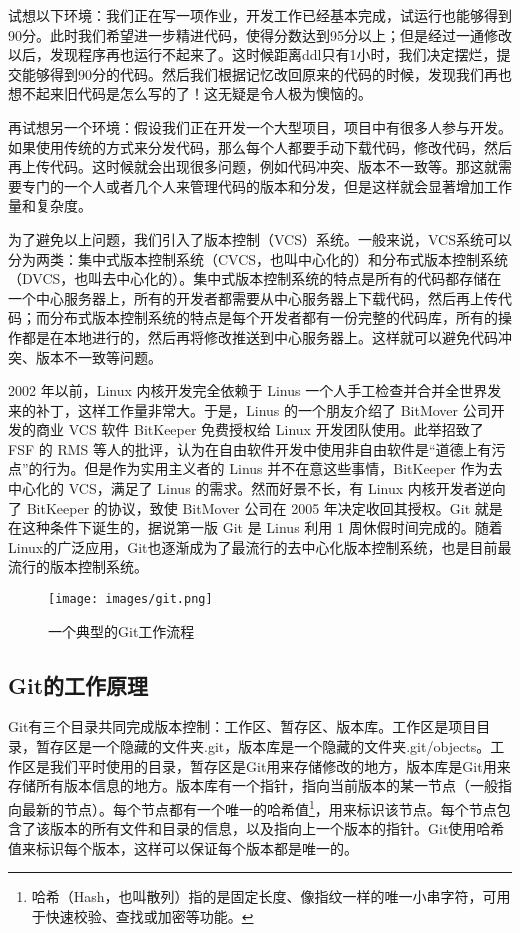 \documentclass[../main.tex]{subfiles}
\begin{document}
试想以下环境：我们正在写一项作业，开发工作已经基本完成，试运行也能够得到90分。此时我们希望进一步精进代码，使得分数达到95分以上；但是经过一通修改以后，发现程序再也运行不起来了。这时候距离ddl只有1小时，我们决定摆烂，提交能够得到90分的代码。然后我们根据记忆改回原来的代码的时候，发现我们再也想不起来旧代码是怎么写的了！这无疑是令人极为懊恼的。

再试想另一个环境：假设我们正在开发一个大型项目，项目中有很多人参与开发。如果使用传统的方式来分发代码，那么每个人都要手动下载代码，修改代码，然后再上传代码。这时候就会出现很多问题，例如代码冲突、版本不一致等。那这就需要专门的一个人或者几个人来管理代码的版本和分发，但是这样就会显著增加工作量和复杂度。

为了避免以上问题，我们引入了版本控制（VCS）系统。一般来说，VCS系统可以分为两类：集中式版本控制系统（CVCS，也叫中心化的）和分布式版本控制系统（DVCS，也叫去中心化的）。集中式版本控制系统的特点是所有的代码都存储在一个中心服务器上，所有的开发者都需要从中心服务器上下载代码，然后再上传代码；而分布式版本控制系统的特点是每个开发者都有一份完整的代码库，所有的操作都是在本地进行的，然后再将修改推送到中心服务器上。这样就可以避免代码冲突、版本不一致等问题。

2002 年以前，Linux 内核开发完全依赖于 Linus 一个人手工检查并合并全世界发来的补丁，这样工作量非常大。于是，Linus 的一个朋友介绍了 BitMover 公司开发的商业 VCS 软件 BitKeeper 免费授权给 Linux 开发团队使用。此举招致了 FSF 的 RMS 等人的批评，认为在自由软件开发中使用非自由软件是“道德上有污点”的行为。但是作为实用主义者的 Linus 并不在意这些事情，BitKeeper 作为去中心化的 VCS，满足了 Linus 的需求。然而好景不长，有 Linux 内核开发者逆向了 BitKeeper 的协议，致使 BitMover 公司在 2005 年决定收回其授权。Git 就是在这种条件下诞生的，据说第一版 Git 是 Linus 利用 1 周休假时间完成的。随着Linux的广泛应用，Git也逐渐成为了最流行的去中心化版本控制系统，也是目前最流行的版本控制系统。

\begin{figure}[ht]
  \centering
  \texttt{[image: images/git.png]}
  \caption{一个典型的Git工作流程}
  \label{fig:git-workflow}
\end{figure}

\subsection{Git的工作原理}

Git有三个目录共同完成版本控制：工作区、暂存区、版本库。工作区是项目目录，暂存区是一个隐藏的文件夹.git，版本库是一个隐藏的文件夹.git/objects。工作区是我们平时使用的目录，暂存区是Git用来存储修改的地方，版本库是Git用来存储所有版本信息的地方。版本库有一个指针，指向当前版本的某一节点（一般指向最新的节点）。每个节点都有一个唯一的哈希值\footnote{哈希（Hash，也叫散列）指的是固定长度、像指纹一样的唯一小串字符，可用于快速校验、查找或加密等功能。}，用来标识该节点。每个节点包含了该版本的所有文件和目录的信息，以及指向上一个版本的指针。Git使用哈希值来标识每个版本，这样可以保证每个版本都是唯一的。
\end{document}
